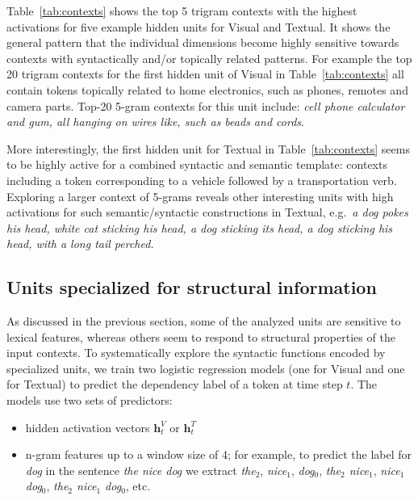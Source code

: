 Table~\ref{tab:contexts} shows the top 5 trigram contexts with the
highest activations for five example hidden units for {\sc Visual}
and {\sc Textual}. 
It shows the general pattern that the individual
dimensions become highly sensitive towards contexts with syntactically
and/or topically related patterns. 
For example the top 20 trigram
contexts for the first hidden unit of {\sc Visual} in
Table~\ref{tab:contexts} all contain tokens topically  
related to home electronics, such as phones, remotes and camera parts. Top-20 
5-gram contexts for this unit include: {\it cell phone calculator and gum, 
all hanging on wires like, such as beads and cords}. 

More interestingly, the first hidden unit  for {\sc Textual} in  Table~\ref{tab:contexts}
seems to be highly active for a combined syntactic and semantic template:
contexts including a token corresponding to a vehicle followed by a transportation verb.
Exploring a larger context of 5-grams reveals other interesting units 
with high activations for such semantic/syntactic constructions in {\sc Textual}, e.g.\
{\it a dog pokes his head, white cat sticking his head, a dog sticking its head, a dog 
sticking his head, with a long tail perched.} 

\subsection{Units specialized for structural information}
\label{sec:syntacticdim}

As discussed in the previous section, some of the analyzed units are sensitive to 
lexical features, whereas others seem to respond to structural properties of the 
input contexts. To systematically explore the syntactic functions encoded by 
specialized units, we train two logistic regression models (one for {\sc Visual} 
and one for {\sc Textual}) to predict the dependency label of a token at time
step $t$. The models use two sets of predictors:
\begin{itemize}
  \item hidden activation vectors $\mathbf{h}_t^V$ or $\mathbf{h}_t^T$
  \item n-gram features up to a window size of 4; for example, to predict the label 
  for {\it dog} in the sentence {\it the nice dog} we extract {\it the}$_2$, {\it nice}$_1$, 
  {\it dog}$_0$, {\it the$_2$ nice$_1$}, {\it nice$_1$ dog$_0$}, {\it the$_2$ nice$_1$ 
  dog$_0$}, etc.
\end{itemize}


